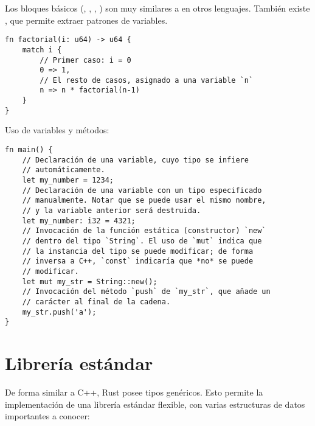 Los bloques básicos (, , , ) son muy
similares a en otros lenguajes. También existe , que permite extraer
patrones de variables.

\begin{verbatim}
fn factorial(i: u64) -> u64 {
    match i {
        // Primer caso: i = 0
        0 => 1,
        // El resto de casos, asignado a una variable `n`
        n => n * factorial(n-1)
    }
}
\end{verbatim}

Uso de variables y métodos:

\begin{verbatim}
fn main() {
    // Declaración de una variable, cuyo tipo se infiere
    // automáticamente.
    let my_number = 1234;
    // Declaración de una variable con un tipo especificado
    // manualmente. Notar que se puede usar el mismo nombre,
    // y la variable anterior será destruida.
    let my_number: i32 = 4321;
    // Invocación de la función estática (constructor) `new`
    // dentro del tipo `String`. El uso de `mut` indica que
    // la instancia del tipo se puede modificar; de forma
    // inversa a C++, `const` indicaría que *no* se puede
    // modificar.
    let mut my_str = String::new();
    // Invocación del método `push` de `my_str`, que añade un
    // carácter al final de la cadena.
    my_str.push('a');
}
\end{verbatim}

\section{Librería estándar}

De forma similar a C++, Rust posee tipos genéricos. Esto permite la
implementación de una librería estándar flexible, con varias estructuras de
datos importantes a conocer:

